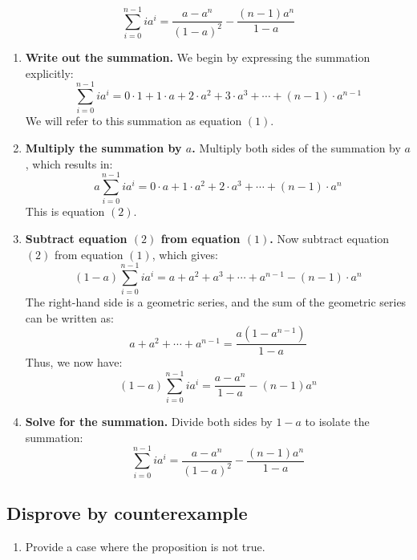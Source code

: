 \begin{example}
    \[
    \sum_{i=0}^{n-1} i a^i = \frac{a - a^n}{(1 - a)^2} - \frac{(n - 1) a^n}{1 - a}
    \]
        
    \begin{enumerate}
        \item \textbf{Write out the summation.}
        We begin by expressing the summation explicitly:
        \[
        \sum_{i=0}^{n-1} i a^i = 0 \cdot 1 + 1 \cdot a + 2 \cdot a^2 + 3 \cdot a^3 + \cdots + (n - 1) \cdot a^{n-1}
        \]
        We will refer to this summation as equation \( (1) \).
        
        \item \textbf{Multiply the summation by \( a \).}
        Multiply both sides of the summation by \( a \), which results in:
        \[
        a \sum_{i=0}^{n-1} i a^i = 0 \cdot a + 1 \cdot a^2 + 2 \cdot a^3 + \cdots + (n-1) \cdot a^n
        \]
        This is equation \( (2) \).
        
        \item \textbf{Subtract equation \( (2) \) from equation \( (1) \).}
        Now subtract equation \( (2) \) from equation \( (1) \), which gives:
        \[
        (1 - a) \sum_{i=0}^{n-1} i a^i = a + a^2 + a^3 + \cdots + a^{n-1} - (n-1) \cdot a^n
        \]
        The right-hand side is a geometric series, and the sum of the geometric series can be written as:
        \[
        a + a^2 + \cdots + a^{n-1} = \frac{a(1 - a^{n-1})}{1 - a}
        \]
        Thus, we now have:
        \[
        (1 - a) \sum_{i=0}^{n-1} i a^i = \frac{a - a^n}{1 - a} - (n-1) a^n
        \]
        
        \item \textbf{Solve for the summation.}
        Divide both sides by \( 1 - a \) to isolate the summation:
        \[
        \sum_{i=0}^{n-1} i a^i = \frac{a - a^n}{(1 - a)^2} - \frac{(n - 1) a^n}{1 - a}
        \]
    \end{enumerate}
\end{example}

\subsection{Disprove by counterexample}
\begin{process}
    \begin{enumerate}
        \item Provide a case where the proposition is not true.
    \end{enumerate}
\end{process}

